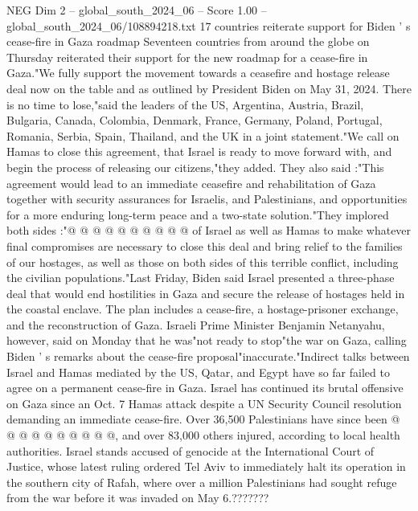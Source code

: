 \begin{textsample}{NEG Dim 2 – global\_south\_2024\_06 – Score 1.00 – global\_south\_2024\_06/108894218.txt}  \label{ex:f2_neg_328}
17 countries reiterate support for Biden ' s cease-fire in Gaza roadmap Seventeen countries from around the globe on Thursday reiterated their support for the new roadmap for a cease-fire in Gaza."We fully support the movement towards a ceasefire and hostage release deal now on the table and as outlined by President Biden on May 31, 2024.
There is no time to lose,"said the leaders of the US, Argentina, Austria, Brazil, Bulgaria, Canada, Colombia, Denmark, France, Germany, Poland, Portugal, Romania, Serbia, Spain, Thailand, and the UK in a joint statement."We call on Hamas to close this agreement, that Israel is ready to move forward with, and begin the process of releasing our citizens,"they added.
They also said :"This agreement would lead to an immediate ceasefire and rehabilitation of Gaza together with security assurances for Israelis, and Palestinians, and opportunities for a more enduring long-term peace and a two-state solution."They implored both sides :"@ @ @ @ @ @ @ @ @ @ of Israel as well as Hamas to make whatever final compromises are necessary to close this deal and bring relief to the families of our hostages, as well as those on both sides of this terrible conflict, including the civilian populations."Last Friday, Biden said Israel presented a three-phase deal that would end hostilities in Gaza and secure the release of hostages held in the coastal enclave.
The plan includes a cease-fire, a hostage-prisoner exchange, and the reconstruction of Gaza.
Israeli Prime Minister Benjamin Netanyahu, however, said on Monday that he was"not ready to stop"the war on Gaza, calling Biden ' s remarks about the cease-fire proposal"inaccurate."Indirect talks between Israel and Hamas mediated by the US, Qatar, and Egypt have so far failed to agree on a permanent cease-fire in Gaza.
Israel has continued its brutal offensive on Gaza since an Oct. 7 Hamas attack despite a UN Security Council resolution demanding an immediate cease-fire.
Over 36,500 Palestinians have since been @ @ @ @ @ @ @ @ @ @, and over 83,000 others injured, according to local health authorities.
Israel stands accused of genocide at the International Court of Justice, whose latest ruling ordered Tel Aviv to immediately halt its operation in the southern city of Rafah, where over a million Palestinians had sought refuge from the war before it was invaded on May 6.???????

\end{textsample}
